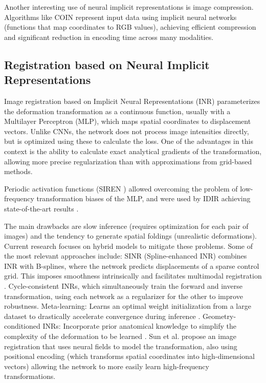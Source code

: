 Another interesting use of neural implicit representations is image compression. Algorithms like COIN \cite{coin} represent input data using implicit neural networks (functions that map coordinates to RGB values), achieving efficient compression and significant reduction in encoding time across many modalities.

\subsection{Registration based on Neural Implicit Representations}\label{subsec:Rexistro_baseado_en_INRs}

Image registration based on Implicit Neural Representations (INR) parameterizes the deformation transformation as a continuous function, usually with a Multilayer Perceptron (MLP), which maps spatial coordinates to displacement vectors. Unlike CNNs, the network does not process image intensities directly, but is optimized using these to calculate the loss. One of the advantages in this context is the ability to calculate exact analytical gradients of the transformation, allowing more precise regularization than with approximations from grid-based methods.

Periodic activation functions (SIREN \cite{sitzmann2020implicitneuralrepresentationsperiodic}) allowed overcoming the problem of low-frequency transformation biases of the MLP, and were used by IDIR achieving state-of-the-art results \cite{wolterink2021implicit}.

The main drawbacks are slow inference (requires optimization for each pair of images) and the tendency to generate spatial foldings (unrealistic deformations). Current research focuses on hybrid models to mitigate these problems.
Some of the most relevant approaches include:
SINR (Spline-enhanced INR) combines INR with B-splines, where the network predicts displacements of a sparse control grid. This imposes smoothness intrinsically and facilitates multimodal registration \cite{SINR}.
Cycle-consistent INRs, which simultaneously train the forward and inverse transformation, using each network as a regularizer for the other to improve robustness.
Meta-learning: Learns an optimal weight initialization from a large dataset to drastically accelerate convergence during inference \cite{learnedinit}.
Geometry-conditioned INRs: Incorporate prior anatomical knowledge to simplify the complexity of the deformation to be learned \cite{harten2023deformable}.
Sun et al. \cite{sun2024medicalimageregistrationneural} propose an image registration that uses neural fields to model the transformation, also using positional encoding (which transforms spatial coordinates into high-dimensional vectors) allowing the network to more easily learn high-frequency transformations.

